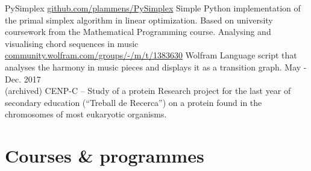 \documentclass[]{twentysecondcv}
\begin{document}
\begin{adjustwidth}{10pt}{10pt}
\renewcommand{\twentylen}{9.7cm}
\begin{twenty}[2.8cm]
      {PySimplex}
      {\href{https://github.com/plammens/PySimplex}{github.com/plammens/PySimplex}}
      {Simple Python implementation of the primal simplex algorithm in linear optimization. Based on university coursework from the Mathematical Programming course.}
      {Analysing and visualising chord sequences in music}
      {\href{https://community.wolfram.com/groups/-/m/t/1383630}{community.wolfram.com/groups/-/m/t/1383630}}
      {Wolfram Language script that analyses the harmony in music pieces and displays it as a transition graph.}
  \twentyitem
      {May - Dec. 2017 \\ (archived)}
      {CENP-C – Study of a protein}
      {}
      {Research project for the last year of secondary education (“Treball de Recerca”) on a protein found in the chromosomes of most eukaryotic organisms.}
\end{twenty}



\section*{Courses \& programmes}


\end{adjustwidth}
\end{document}
